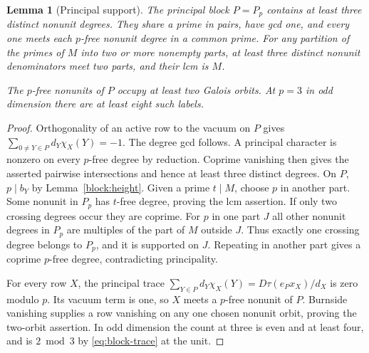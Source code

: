 \documentclass[11pt]{amsart}
\numberwithin{equation}{section}
\newtheorem{lemma}[theorem]{Lemma}
\theoremstyle{definition}
\theoremstyle{plain}
\begin{document}
\begin{lemma}[Principal support]\label{block:witness}
The principal block $P=P_p$ contains at least three distinct nonunit
degrees. They share a prime in pairs, have gcd one, and every one
meets each $p$-free nonunit degree in a common prime. For any
partition of the primes of $M$ into two or more nonempty parts,
at least three distinct nonunit denominators meet two parts, and
their lcm is $M$.

The $p$-free nonunits of $P$ occupy at least two Galois orbits.
At $p=3$ in odd dimension there are at least eight such labels.
\end{lemma}
\begin{proof}
Orthogonality of an active row to the vacuum on $P$ gives
$\sum_{0\ne Y\in P}d_Y\chi_X(Y)=-1$. The degree gcd follows.
A principal character is nonzero on every $p$-free degree by
reduction. Coprime vanishing then gives the asserted pairwise
intersections and hence at least three distinct degrees. On $P$,
$p\mid b_Y$ by Lemma~\ref{block:height}. Given a prime $t\mid M$,
choose $p$ in another part. Some nonunit in $P_p$ has $t$-free
degree, proving the lcm assertion. If only two crossing degrees
occur they are coprime. For $p$ in one part $J$ all other nonunit
degrees in $P_p$ are multiples of the part of $M$ outside $J$.
Thus exactly one crossing degree belongs to $P_p$, and it is
supported on $J$. Repeating in another part gives a coprime
$p$-free degree, contradicting principality.

For every row $X$, the principal trace
$\sum_{Y\in P}d_Y\chi_X(Y)=D\tau(e_Px_X)/d_X$ is zero modulo $p$.
Its vacuum term is one, so $X$ meets a $p$-free nonunit of $P$.
Burnside vanishing supplies a row vanishing on any one chosen
nonunit orbit, proving the two-orbit assertion. In odd dimension
the count at three is even and at least four, and is $2\bmod3$
by \eqref{eq:block-trace} at the unit.
\end{proof}
\end{document}
